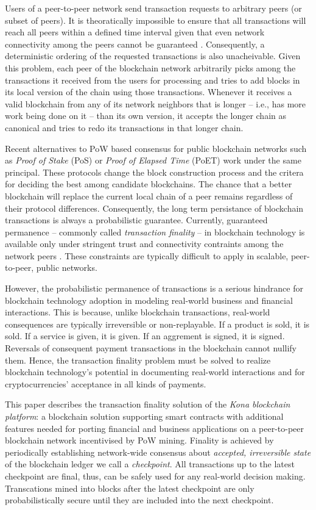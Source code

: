Users of a peer-to-peer network send transaction requests to arbitrary peers (or subset of peers). It is theoratically impossible to ensure that all transactions will reach all peers within a defined time interval given that even network connectivity among the peers cannot be guaranteed \cite{Fischer1983TheCP}. Consequently, a deterministic ordering of the requested transactions is also unacheivable. Given this problem, each peer of the blockchain network arbitrarily picks among the transactions it received from the users for processing  and tries to add blocks in its local version of the chain using those transactions. Whenever it receives a valid blockchain from any of its network neighbors that is longer -- i.e., has more work being done on it -- than its own version, it accepts the longer chain as canonical and tries to redo its transactions in that longer chain. 

Recent alternatives to PoW based consensus for public blockchain networks such as \textit{Proof of Stake} (PoS) \cite{casper} or \textit{Proof of Elapsed Time} (PoET) \cite{poet} work under the same principal. These protocols change the block construction process and the critera for deciding the best among candidate blockchains. The chance that a better blockchain will replace the current local chain of a peer remains regardless of their protocol differences. Consequently, the long term persistance of blockchain transactions is always a probabilistic guarantee. Currently, guaranteed permanence -- commonly called \textit{transaction finality} -- in blockchain technology is available only under stringent trust and connectivity contraints among the network peers \cite{David2014TheRP, thestellar}. These constraints are typically difficult to apply in scalable, peer-to-peer, public networks.   

However, the probabilistic permanence of transactions is a serious hindrance for blockchain technology adoption in modeling real-world business and financial interactions. This is because, unlike blockchain transactions, real-world consequences are typically irreversible or non-replayable. If a product is sold, it is sold. If a service is given, it is given. If an aggrement is signed, it is signed. Reversals of consequent payment transactions in the blockchain cannot nullify them. Hence, the transaction finality problem must be solved to realize blockchain technology's potential in documenting real-world interactions and for cryptocurrencies' acceptance in all kinds of payments.

This paper describes the transaction finality solution of the \textit{Kona blockchain platform}: a blockchain solution supporting smart contracts with additional features needed for porting financial and business applications on a peer-to-peer blockchain network incentivised by PoW mining. Finality is achieved by periodically establishing network-wide consensus about \textit{accepted, irreversible state} of the blockchain ledger we call a \textit{checkpoint}. All transactions up to the latest checkpoint are final, thus, can be safely used for any real-world decision making. Transcations mined into blocks after the latest checkpoint are only probabilistically secure until they are included into the next checkpoint.

